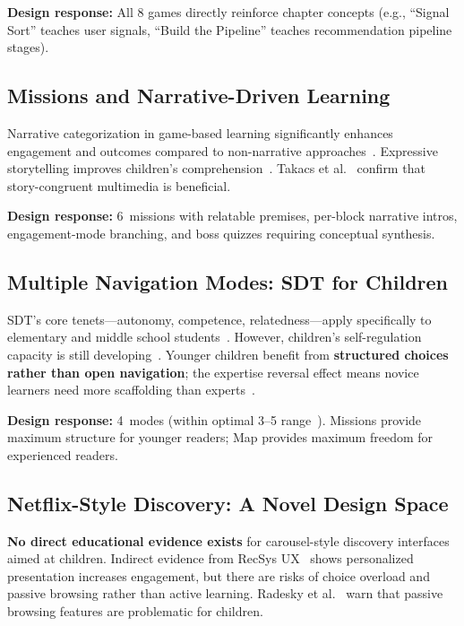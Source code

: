 \documentclass[11pt,a4paper]{article}
\begin{document}
\textbf{Design response:} All 8 games directly reinforce chapter concepts (e.g., ``Signal Sort'' teaches user signals, ``Build the Pipeline'' teaches recommendation pipeline stages).

\subsection{Missions and Narrative-Driven Learning}

Narrative categorization in game-based learning significantly enhances engagement and outcomes compared to non-narrative approaches~\cite{breien2020,oliveira2022}. Expressive storytelling improves children's comprehension~\cite{korywestlund2017}. Takacs et al.~\cite{takacs2015} confirm that story-congruent multimedia is beneficial.

\textbf{Design response:} 6~missions with relatable premises, per-block narrative intros, engagement-mode branching, and boss quizzes requiring conceptual synthesis.

\subsection{Multiple Navigation Modes: SDT for Children}

SDT's core tenets---autonomy, competence, relatedness---apply specifically to elementary and middle school students~\cite{conesa2022}. However, children's self-regulation capacity is still developing~\cite{panadero2017}. Younger children benefit from \textbf{structured choices rather than open navigation}; the expertise reversal effect means novice learners need more scaffolding than experts~\cite{drexler2010}.

\textbf{Design response:} 4~modes (within optimal 3--5 range~\cite{evans2015}). Missions provide maximum structure for younger readers; Map provides maximum freedom for experienced readers.

\subsection{Netflix-Style Discovery: A Novel Design Space}

\textbf{No direct educational evidence exists} for carousel-style discovery interfaces aimed at children. Indirect evidence from RecSys UX~\cite{konstan2012,zanker2019} shows personalized presentation increases engagement, but there are risks of choice overload and passive browsing rather than active learning. Radesky et al.~\cite{radesky2014} warn that passive browsing features are problematic for children.
\end{document}
